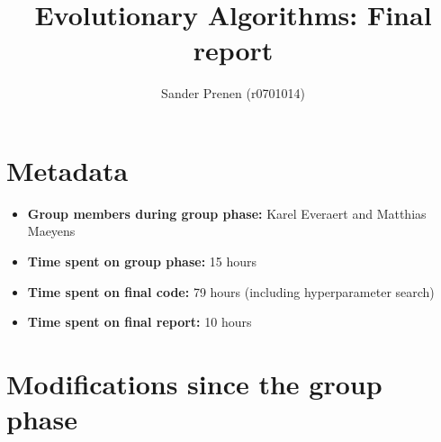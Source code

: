 \documentclass[a4paper,10pt]{article}
\title{Evolutionary Algorithms: Final report}
\author{Sander Prenen (r0701014)}
\newcommand{\nextyear}{\advance\year by 1 \the\year\advance\year by -1}
\newcommand{\deadlineReport}{January 4, \nextyear{} at 16:00 CET}
\newcommand{\RemoveMe}[1]{{\color{purple}#1}}
\begin{document}
\selectfont{}

\maketitle





\section{Metadata}

\begin{itemize}
 \item \textbf{Group members during group phase:} Karel Everaert and Matthias Maeyens
 \item \textbf{Time spent on group phase:} 15 hours
 \item \textbf{Time spent on final code:} 79 hours (including hyperparameter search)
 \item \textbf{Time spent on final report:} 10 hours
\end{itemize}

\section{Modifications since the group phase}
\end{document}
